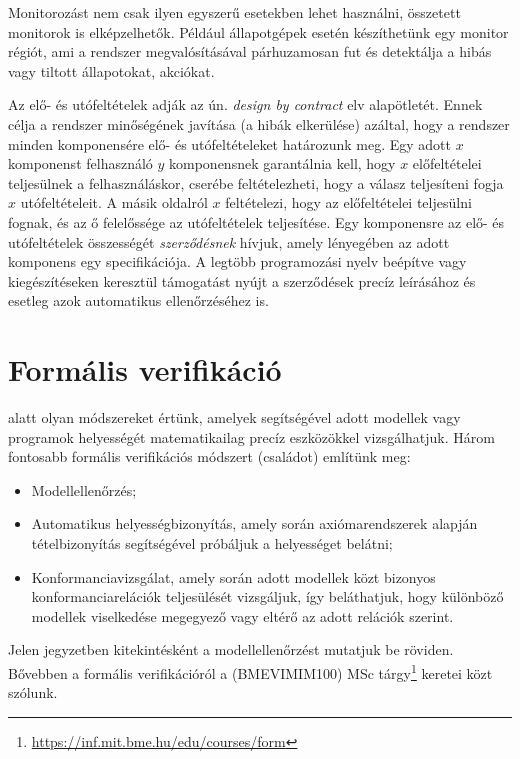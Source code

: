 Monitorozást nem csak ilyen egyszerű esetekben lehet használni, összetett monitorok is elképzelhetők. Például állapotgépek esetén készíthetünk egy monitor régiót, ami a rendszer megvalósításával párhuzamosan fut és detektálja a hibás vagy tiltott állapotokat, akciókat.

\begin{megjegyzes}
Az elő- és utófeltételek adják az ún. \emph{design by contract} elv alapötletét. Ennek célja a rendszer minőségének javítása (a hibák elkerülése) azáltal, hogy a rendszer minden komponensére elő- és utófeltételeket határozunk meg. Egy adott $x$ komponenst felhasználó $y$ komponensnek garantálnia kell, hogy $x$ előfeltételei teljesülnek a felhasználáskor, cserébe feltételezheti, hogy a válasz teljesíteni fogja $x$ utófeltételeit. A másik oldalról $x$ feltételezi, hogy az előfeltételei teljesülni fognak, és az ő felelőssége az utófeltételek teljesítése. Egy komponensre az elő- és utófeltételek összességét \emph{szerződésnek} hívjuk, amely lényegében az adott komponens egy specifikációja. A legtöbb programozási nyelv beépítve vagy kiegészítéseken keresztül támogatást nyújt a szerződések precíz leírásához és esetleg azok automatikus ellenőrzéséhez is.
\end{megjegyzes}





\section{Formális verifikáció\kieg}\label{sec:formalis-verifikacio}
 alatt olyan módszereket értünk, amelyek segítségével adott modellek vagy programok helyességét matematikailag precíz eszközökkel vizsgálhatjuk. Három fontosabb formális verifikációs módszert (családot) említünk meg:
\begin{itemize}
\item Modellellenőrzés;
\item Automatikus helyességbizonyítás, amely során axiómarendszerek alapján tételbizonyítás segítségével próbáljuk a helyességet belátni;
\item Konformanciavizsgálat, amely során adott modellek közt bizonyos konformanciarelációk teljesülését vizsgáljuk, így beláthatjuk, hogy különböző modellek viselkedése megegyező vagy eltérő az adott relációk szerint.
\end{itemize}

Jelen jegyzetben kitekintésként a modellellenőrzést mutatjuk be röviden. Bővebben a formális verifikációról a \form (BMEVIMIM100) MSc tárgy\footnote{\url{https://inf.mit.bme.hu/edu/courses/form}} keretei közt szólunk.

